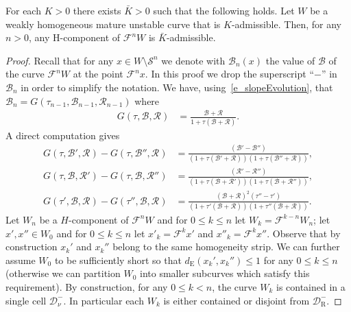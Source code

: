 \documentclass[AHL, Unicode, longabstracts,published]{cedram}
\newcommand{\cB}{\mathcal{B}}
\newcommand{\cpar}{\mathcal{R}}
\newcommand{\pslope}{\mathcal{B}}
\newcommand{\cm}{\mathcal{F}}
\newcommand{\cell}{\mathcal{D}}
\newcommand{\recoPrivate}{\mathrm{R}}
\newcommand{\reco}{{\cell^-_{\recoPrivate}}}
\newcommand{\eum}{_\text{E}}
\newcommand{\ppPrivate}[2]{#1^{#2}}
\newcommand{\prePrivate}[1]{\ppPrivate{#1}{-}}
\newcommand{\prpslope}{\prePrivate{\pslope}}
\newcommand{\singPrivate}{\mathcal{S}}
\newcommand{\sing}[1]{\singPrivate^{#1}}
\newcommand{\admiss}{admissible}
\newcommand{\indCell}{\nu}
\renewcommand{\prpslope}{\cB}
\renewcommand{\prpslope}{\cB}
\renewcommand{\prpslope}{\cB}
\begin{document}
\begin{prop}\label{PrBHold}
For each $K > 0$ there exists $\bar{K} > 0$ such that the following holds. Let $W$ be a weakly homogeneous mature unstable curve that is $K$-\admiss{}. Then, for any $n > 0$, any H-component of $\cm^{n}W$ is $\bar K$-\admiss{}.
\end{prop}
\begin{proof}
Recall that for any $x\in W\setminus\sing{n}$ we denote with $\prpslope_{n}(x)$ the value of $\prpslope$ of the curve $\cm^{n}W$ at the point $\cm^{n}x$. In this proof we drop the superscript ``$-$'' in $\prpslope_n$ in order to simplify the notation. We have, using~\eqref{e_slopeEvolution}, that $\cB_n=G(\tau_{n-1}, \cB_{n-1}, \cpar_{n-1})$ where
\begin{align*}
G(\tau, \cB, \cpar) &= \frac{\cB+\cpar}{1+\tau(\cB+\cpar)}.
\end{align*}
A direct computation gives
\begin{subequations}\label{DeltaG}
\begin{align}
G(\tau, \cB', \cpar)-G(\tau, \cB'', \cpar)&=\frac{ (\cB'-\cB'')}{(1+\tau(\cB'+\cpar))(1+\tau(\cB''+\cpar))}, \\
G(\tau, \cB, \cpar')-G(\tau, \cB, \cpar'')&=\frac{ (\cpar'-\cpar'')}{(1+\tau(\cB+\cpar'))(1+\tau(\cB+\cpar''))},\\
G(\tau', \cB, \cpar)-G(\tau'', \cB, \cpar)&=\frac{(\cB+\cpar)^2 (\tau''-\tau')}{(1+\tau'(\cB+\cpar))(1+\tau''(\cB+\cpar))}.\label{e_DeltaG-tau}
\end{align}
\end{subequations}
Let $W_{n}$ be a $H$-component of $\cm^{n}W$ and for $0 \le k \le n $ let $W_k = \cm^{k-n}W_n$; let $x',x''\in W_0$ and for $0 \le k \le n $ let $x'_k = \cm^{k}x'$ and $x''_{k} = \cm^{k}x''$. Observe that by construction $x_k'$ and $x_k''$ belong to the same homogeneity strip. We can further assume $W_0$ to be sufficiently short so that $d\eum(x_k', x_k'')\leq 1$ for any $0\le k\le n$ (otherwise we can partition $W_{0}$ into smaller subcurves which satisfy this requirement). By construction, for any $0\le k < n$, the curve $W_{k}$ is contained in a single cell $\cell^{-}_{\indCell}$. In particular each $W_{k}$ is either contained or disjoint from $\reco$.


\end{proof}
\end{document}
